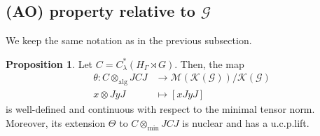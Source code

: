 \documentclass{amsart}
\theoremstyle{definition}
\newtheorem{proposition}[theorem]{Proposition}
\newcommand{\longto}{\longrightarrow}
\newcommand{\mintensor}{\otimes_{\mathrm{min}}}
\newcommand{\algtensor}{\otimes_{\mathrm{alg}}}
\begin{document}
\subsection{(AO) property relative to $\mathcal{G}$}
We keep the same notation as in the previous subsection. 
\begin{proposition}
Let $C=C^{\ast}_{\lambda}(H_{\Gamma}\rtimes G)$. Then, the map
\begin{align}
\theta : C\algtensor JCJ &\longto \mathcal{M}(\mathcal{K}(\mathcal{G}))/\mathcal{K}(\mathcal{G}) \\
x\otimes JyJ &\longmapsto [xJyJ]
\end{align}
is well-defined and continuous with respect to the minimal tensor norm. 
Moreover, its extension $\Theta$ to $C\mintensor JCJ$ is nuclear and has a u.c.p.\@ lift. 
\end{proposition}
\end{document}
